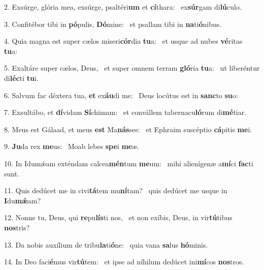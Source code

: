 2. Exsúrge, glória mea, exsúrge, psaltéri\textbf{um} et \textbf{cí}thara: \ast\  ex\textbf{súr}gam di\textbf{lú}culo.\

3. Confitébor tibi in \textbf{pó}pulis, \textbf{Dó}mine: \ast\  et psallam tibi in \textbf{na}ti\textbf{ó}nibus.\

4. Quia magna est super cælos miseri\textbf{cór}dia \textbf{tu}a: \ast\  et usque ad nubes \textbf{vé}ritas \textbf{tu}a:\

5. Exaltáre super cælos, Deus, \dag\  et super omnem terram \textbf{gló}ria \textbf{tu}a: \ast\  ut liberéntur di\textbf{léc}ti \textbf{tu}i.\

6. Salvum fac déxtera tua, \textbf{et} ex\textbf{áu}di me: \ast\  Deus locútus est in \textbf{sanc}to \textbf{su}o:\

7. Exsultábo, et \textbf{dí}vidam \textbf{Sí}chimam: \ast\  et convállem tabernacu\textbf{ló}rum di\textbf{mé}tiar.\

8. Meus est Gálaad, et meus \textbf{est} Ma\textbf{nás}ses: \ast\  et Ephraim suscéptio \textbf{cá}pitis \textbf{me}i.\

9. \textbf{Ju}da rex \textbf{me}us: \ast\  Moab lebes \textbf{spe}i \textbf{me}æ.\

10. In Idumǽam exténdam calcea\textbf{mén}tum \textbf{me}um: \ast\  mihi alienígenæ a\textbf{mí}ci \textbf{fac}ti sunt.\

11. Quis dedúcet me in civi\textbf{tá}tem mu\textbf{ní}tam? \ast\  quis dedúcet me usque in \textbf{I}du\textbf{mǽ}am?\

12. Nonne tu, Deus, qui \textbf{re}pu\textbf{lís}ti nos, \ast\  et non exíbis, Deus, in vir\textbf{tú}tibus \textbf{nos}tris?\

13. Da nobis auxílium de tribu\textbf{la}ti\textbf{ó}ne: \ast\  quia vana \textbf{sa}lus \textbf{hó}minis.\

14. In Deo faci\textbf{é}mus vir\textbf{tú}tem: \ast\  et ipse ad níhilum dedúcet ini\textbf{mí}cos \textbf{nos}tros.\

